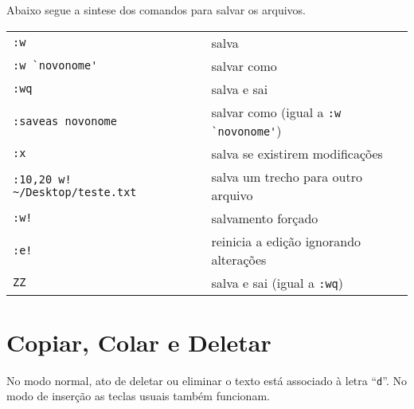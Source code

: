 Abaixo segue a sintese dos comandos para salvar os arquivos.
\begin{table}[htb]\begin{center} \begin{tabular}{ll} \hline
     \verb|:w| & salva\\
     \verb|:w `novonome'| & salvar como\\
     \verb|:wq| & salva e sai\\
     \verb|:saveas novonome| & salvar como (igual a \verb|:w `novonome'|)\\
     \verb|:x| & salva se existirem modificações\\
     \verb|:10,20 w! ~/Desktop/teste.txt | & salva um trecho para outro arquivo\\
     \verb|:w!| & salvamento forçado\\
     \verb|:e!| & reinicia a edição ignorando alterações\\
     \verb|ZZ| & salva e sai (igual a \verb|:wq|)\\
\hline \end{tabular}\end{center}\end{table}

\section{Copiar, Colar e Deletar}\label{sec:CopiarColarEDeletar}
No modo normal, ato de deletar ou eliminar o texto está associado
à letra ``\verb|d|''. No modo de inserção as teclas usuais também 
funcionam.

